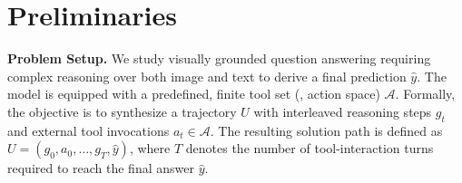 \section{Preliminaries}
\label{sec:pre}
\noindent \textbf{Problem Setup.} 
We study visually grounded question answering requiring complex reasoning over both image and text to derive a final prediction $\hat{y}$. 
The model is equipped with a predefined, finite tool set (\ie, action space) \(\mathcal{A}\). 
Formally, the objective is to synthesize a trajectory $U$ with interleaved reasoning steps $g_t$ and external tool invocations $a_t \in \mathcal{A}$. 
The resulting solution path is defined as $U=(g_0, a_0, \dots, g_T, \hat{y})$, where $T$ denotes the number of tool-interaction turns required to reach the final answer $\hat{y}$.




